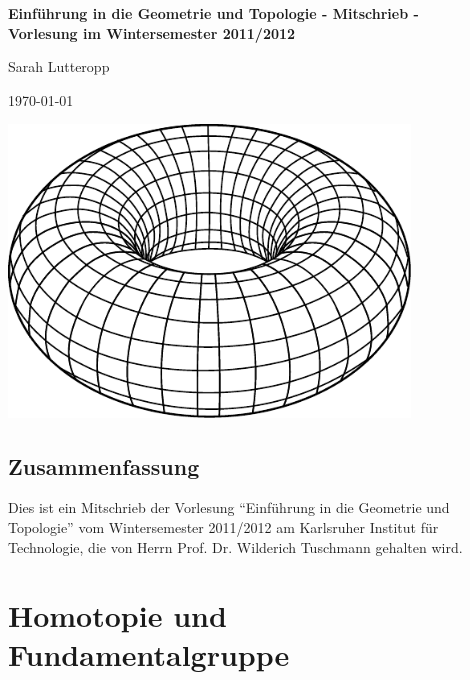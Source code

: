 \documentclass[a4paper,11pt,notitlepage]{report}
\begin{document}
\setcounter{chapter}{0}

\begin{titlepage}
	\begin{center}	
		\LARGE \textbf{{Einführung in die Geometrie und Topologie - Mitschrieb -} \\[5ex] 
    		{\Large Vorlesung im Wintersemester 2011/2012\\[5ex]}}
	\end{center}
	\begin{center}
		\Large Sarah Lutteropp
	\end{center}
	\begin{center}
		\today
	\end{center}
	\vspace{2cm}
	\begin{center}
		\includegraphics[width=0.8\textwidth]{torus2.pdf}
	\end{center}
\end{titlepage}
\setcounter{tocdepth}{1}
\tableofcontents

\section*{Zusammenfassung}
Dies ist ein Mitschrieb der Vorlesung “Einführung in die Geometrie und Topologie” vom Wintersemester 2011/2012 am Karlsruher Institut für Technologie, die von Herrn Prof. Dr. Wilderich Tuschmann gehalten wird.

\chapter{Homotopie und Fundamentalgruppe}
\setcounter{section}{-1}
\end{document}
